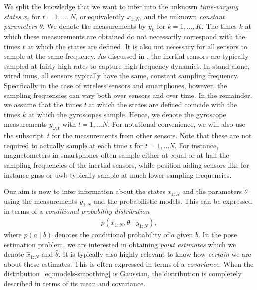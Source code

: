 We split the knowledge that we want to infer into the unknown \emph{time-varying states} $x_t$ for $t = 1, \hdots, N$, or equivalently $x_{1:N}$, and the unknown \emph{constant parameters} $\theta$. We denote the measurements by $y_k$ for $k = 1, \hdots, K$. The times $k$ at which these measurements are obtained do not necessarily correspond with the times $t$ at which the states are defined. It is also not necessary for all sensors to sample at the same frequency. As discussed in , the inertial sensors are typically sampled at fairly high rates to capture high-frequency dynamics. In stand-alone, wired \glspl{imu}, all sensors typically have the same, constant sampling frequency. Specifically in the case of wireless sensors and smartphones, however, the sampling frequencies can vary both over sensors and over time. In the remainder, we assume that the times $t$ at which the states are defined coincide with the times $k$ at which the gyroscopes sample. Hence, we denote the gyroscope measurements $y_{\omega,t}$ with $t = 1, \hdots N$. For notational convenience, we will also use the subscript~$t$ for the measurements from other sensors. Note that these are not required to actually sample at each time $t$ for $t = 1, \hdots N$. For instance, magnetometers in smartphones often sample either at equal or at half the sampling frequencies of the inertial sensors, while position aiding sensors like for instance \gls{gnss} or \gls{uwb} typically sample at much lower sampling frequencies. 

Our aim is now to infer information about the states $x_{1:N}$ and the parameters $\theta$ using the measurements $y_{1:N}$ and the probabilistic models. This can be expressed in terms of a \emph{conditional probability distribution}
\begin{align}
\label{eq:models-smoothing}
p(x_{1:N}, \theta \mid y_{1:N} ),
\end{align}
where $p ( a \mid b )$ denotes the conditional probability of $a$ given $b$. In the pose estimation problem, we are interested in obtaining \emph{point estimates} which we denote $\hat{x}_{1:N}$ and $\hat{\theta}$. It is typically also highly relevant to know how \emph{certain} we are about these estimates. This is often expressed in terms of a \emph{covariance}. When the distribution~\eqref{eq:models-smoothing} is Gaussian, the distribution is completely described in terms of its mean 
and covariance. 

